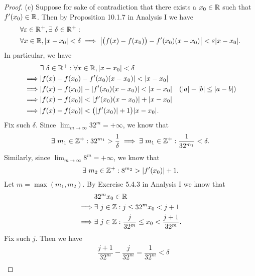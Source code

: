 \begin{proof}{(c)}
  Suppose for sake of contradiction that there exists a \(x_0 \in \mathbb{R}\) such that \(f'(x_0) \in \mathbb{R}\).
  Then by Proposition 10.1.7 in Analysis I we have
  \begin{align*}
     & \forall \varepsilon \in \R^+, \exists\ \delta \in \R^+ :                                                                         \\
     & \forall x \in \R, \abs{x - x_0} < \delta \implies \abs{\big(f(x) - f(x_0)\big) - f'(x_0) (x - x_0)} < \varepsilon \abs{x - x_0}.
  \end{align*}
  In particular, we have
  \begin{align*}
             & \exists\ \delta \in \R^+ : \forall x \in \R, \abs{x - x_0} < \delta                                        \\
    \implies & \abs{f(x) - f(x_0) - f'(x_0) (x - x_0)} < \abs{x - x_0}                                                    \\
    \implies & \abs{f(x) - f(x_0)} - \abs{f'(x_0) (x - x_0)} < \abs{x - x_0}       & (\abs{a} - \abs{b} \leq \abs{a - b}) \\
    \implies & \abs{f(x) - f(x_0)} < \abs{f'(x_0) (x - x_0)} + \abs{x - x_0}                                              \\
    \implies & \abs{f(x) - f(x_0)} < \big(\abs{f'(x_0)} + 1\big) \abs{x - x_0}.
  \end{align*}
  Fix such \(\delta\).
  Since \(\lim_{m \to \infty} 32^m = +\infty\), we know that
  \[
    \exists\ m_1 \in \mathbb{Z}^+ : 32^{m_1} > \dfrac{1}{\delta} \implies \exists\ m_1 \in \mathbb{Z}^+ : \dfrac{1}{32^{m_1}} < \delta.
  \]
  Similarly, since \(\lim_{m \to \infty} 8^m = +\infty\), we know that
  \[
    \exists\ m_2 \in \mathbb{Z}^+ : 8^{m_2} > \left\lvert f'(x_0)\right\rvert + 1.
  \]
  Let \(m = \max(m_1, m_2)\).
  By Exercise 5.4.3 in Analysis I we know that
  \begin{align*}
             & 32^m x_0 \in \mathbb{R}                                                     \\
    \implies & \exists\ j \in \mathbb{Z} : j \leq 32^m x_0 < j + 1                         \\
    \implies & \exists\ j \in \mathbb{Z} : \dfrac{j}{32^m} \leq x_0 < \dfrac{j + 1}{32^m}.
  \end{align*}
  Fix such \(j\).
  Then we have
  \begin{align*}
             & \dfrac{j + 1}{32^m} - \dfrac{j}{32^m} = \dfrac{1}{32^m} < \delta                                                                                             \\

\end{align*}
\end{proof}
